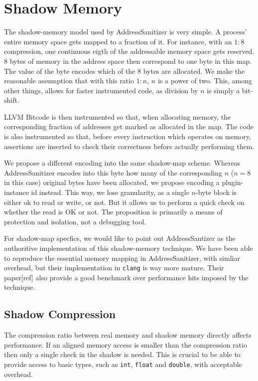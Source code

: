 \chapter {Shadow Memory}

The shadow-memory model used by AddressSanitizer is very simple. A process'
entire memory space gets mapped to a fraction of it. For instance, with an $1:8$
compression, one continuous eigth of the addressable memory space gets reserved.
8 bytes of memory in the address space then correspond to one byte in this
map. The value of the byte encodes which of the 8 bytes are allocated. We make
the reasonable assumption that with this ratio $1:n$, $n$ is a power of two.
This, among other things, allows for faster instrumented code, as division by
$n$ is simply a bit-shift.

LLVM Bitcode is then instrumented so that, when allocating memory, the
corresponding fraction of addresses get marked as allocated in the map. The code
is also instrumented so that, before every instruction which operates on memory,
assertions are inserted to check their correctness before actually performing
them.

We propose a different encoding into the same shadow-map scheme. Whereas
AddressSanitizer encodes into this byte how many of the corresponding $n$ ($n = 8$
in this case) original bytes have been allocated, we propose encoding a
plugin-instance id instead. This way, we lose granularity, as a single $n$-byte
block is either ok to read or write, or not. But it allows us to perform a quick
check on whether the read is OK or not. The proposition is primarily a means of
protection and isolation, not a debugging tool.

For shadow-map specfics, we would like to point out AddressSantizer as the
authoritive implementation of this shadow-memory technique. We have been able to
reproduce the essential memory mapping in AddressSanitizer, with simliar
overhead, but their implementation in \texttt{clang} is way more mature. Their
paper[ref] also provide a good benchmark over performance hits imposed by the
technique.


\section {Shadow Compression}

The compression ratio between real memory and shadow memory directly affects
performance. If an aligned memory access is smaller than the compression ratio
then only a single check in the shadow is needed. This is crucial to be able to
provide access to basic types, such as \texttt{int}, \texttt{float} and
\texttt{double}, with acceptable overhead.

